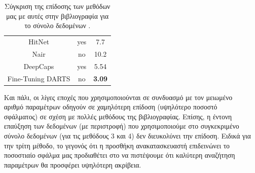 \begin{table}[h]
\begin{center}
{\begin{tabular}{c c c}
            HitNet \cite{deliege2018_hitnet}& yes &7.7 \\
            Nair \cite{nair2021pushing_Nair}& no  & 10.2\\
            DeepCaps \cite{rajasegaran2019deepcaps}& yes & 5.54\\
            \midrule %
            Fine-Tuning DARTS\cite{tanveer2021fine} & no  & \textbf{3.09}\\
            \bottomrule
        \end{tabular}
        }
    \end{center}
    \caption[]{\label{tab:all_methods_comparison_fashionmnist}Σύγκριση της επίδοσης των μεθόδων μας με αυτές στην βιβλιογραφία για το σύνολο δεδομένων .} 
\end{table}

Και πάλι, οι λίγες εποχές που χρησιμοποιούνται σε συνδυασμό με τον μειωμένο αριθμό παραμέτρων οδηγούν σε χαμηλότερη επίδοση (υψηλότερο ποσοστό σφάλματος) σε σχέση με πολλές μεθόδους της βιβλιογραφίας. Επίσης, η έντονη επαύξηση των δεδομένων (με περιστροφή) που χρησιμοποιούμε στο συγκεκριμένο σύνολο δεδομένων (για τις μεθόδους 3 και 4) δεν διευκολύνει την επίδοση. Ειδικά για την τρίτη μέθοδο, το γεγονός ότι η προσθήκη ανακατασκευαστή επιδεινώνει το ποσοστιαίο σφάλμα μας προδιαθέτει στο να πιστέψουμε ότι καλύτερη αναζήτηση παραμέτρων θα προσφέρει υψηλότερη ακρίβεια.

